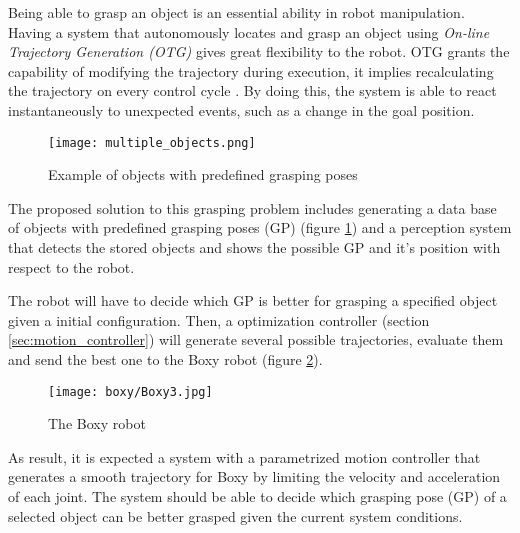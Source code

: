 Being able to grasp an object is an essential ability in robot manipulation. Having a system that autonomously locates and grasp an object using \textit{On-line Trajectory Generation (OTG)} gives great flexibility to the robot. OTG grants the capability of modifying the trajectory during execution, it implies recalculating the trajectory on every control cycle . By doing this, the system is able to react instantaneously to unexpected events, such as a change in the goal position.

\begin{figure}[H]
	\centering
	\texttt{[image: multiple\_objects.png]}
	\vspace{-10pt}
	\caption{Example of objects with predefined grasping poses}
	\vspace{-15pt}
	\label{fig:obj_grasp_pose}
\end{figure}

The proposed solution to this grasping problem includes generating a data base of objects with predefined grasping poses (GP) (figure \ref{fig:obj_grasp_pose}) and a perception system that detects the stored objects and shows the possible GP and it's position with respect to the robot.

The robot will have to decide which GP is better for grasping a specified object given a initial configuration. Then, a optimization controller (section \ref{sec:motion_controller}) will generate several possible trajectories, evaluate them and send the best one to the Boxy robot (figure \ref{fig:boxy}).

\begin{figure}[H]
	\centering
	\texttt{[image: boxy/Boxy3.jpg]}
	\vspace{-10pt}
	\caption{The Boxy robot}
	\vspace{-15pt}
	\label{fig:boxy}
\end{figure}

As result, it is expected a system with a parametrized motion controller that generates a smooth trajectory for Boxy by limiting the velocity and acceleration of each joint. The system should be able to decide which grasping pose (GP) of a selected object can be better grasped given the current system conditions.



